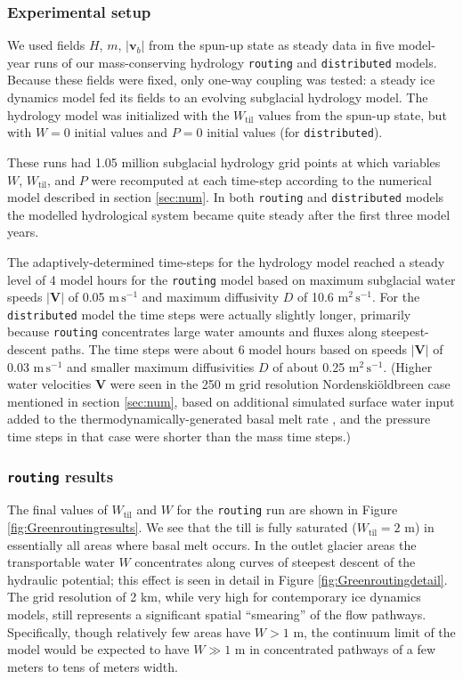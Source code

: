 \documentclass[gmd]{copernicus}   %
\newcommand{\text}{\textrm}
\newcommand\bv{\mathbf{v}}
\newcommand\bV{\mathbf{V}}
\newcommand{\Wtil}{W_{\text{til}}}
\newcommand{\Nbreen}{Nordenski\"oldbreen\xspace}
\begin{document}
\subsubsection{Experimental setup}  We used fields $H$, $m$, $|\bv_b|$ from the spun-up state as steady data in five model-year runs of our mass-conserving hydrology \texttt{routing} and \texttt{distributed} models.  Because these fields were fixed, only one-way coupling was tested: a steady ice dynamics model fed its fields to an evolving subglacial hydrology model.  The hydrology model was initialized with the $\Wtil$ values from the spun-up state, but with $W=0$ initial values and $P=0$ initial values (for \texttt{distributed}).

These runs had 1.05 million subglacial hydrology grid points at which variables $W$, $\Wtil$, and $P$ were recomputed at each time-step according to the numerical model described in section \ref{sec:num}.  In both \texttt{routing} and \texttt{distributed} models the modelled hydrological system became quite steady after the first three model years.

The adaptively-determined time-steps for the hydrology model reached a steady level of 4 model hours for the \texttt{routing} model based on maximum subglacial water speeds $|\bV|$ of 0.05 $\text{m}\,\text{s}^{-1}$ and maximum diffusivity $D$ of 10.6 $\text{m}^2\,\text{s}^{-1}$.  For the \texttt{distributed} model the time steps were actually slightly longer, primarily because \texttt{routing} concentrates large water amounts and fluxes along steepest-descent paths.  The time steps were about 6 model hours based on speeds $|\bV|$ of 0.03 $\text{m}\,\text{s}^{-1}$ and smaller maximum diffusivities $D$ of about 0.25 $\text{m}^2\,\text{s}^{-1}$.  (Higher water velocities $\bV$ were seen in the 250 m grid resolution \Nbreen case mentioned in section \ref{sec:num}, based on additional simulated surface water input added to the thermodynamically-generated basal melt rate \citep{vanPeltthesis}, and the pressure time steps in that case were shorter than the mass time steps.)

\subsubsection{\texttt{routing} results}  The final values of $\Wtil$ and $W$ for the \texttt{routing} run are shown in Figure \ref{fig:Greenroutingresults}.  We see that the till is fully saturated ($\Wtil=2$ m) in essentially all areas where basal melt occurs.  In the outlet glacier areas the transportable water $W$ concentrates along curves of steepest descent of the hydraulic potential; this effect is seen in detail in Figure \ref{fig:Greenroutingdetail}.  The grid resolution of 2 km, while very high for contemporary ice dynamics models, still represents a significant spatial ``smearing'' of the flow pathways.  Specifically, though relatively few areas have $W>1$ m, the continuum limit of the model would be expected to have $W\gg 1$ m in concentrated pathways of a few meters to tens of meters width.
\end{document}
